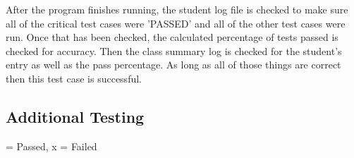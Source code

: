 After the program finishes running, the student log file is checked to make sure all of the critical test cases were 'PASSED' and all of the other test cases were run. Once that has been checked, the calculated percentage of tests passed is checked for accuracy. Then the class summary log is checked for the student's entry as well as the pass percentage. As long as all of those things are correct then this test case is successful.


\subsection{Additional Testing}


\begin{center}
\checkmark = Passed, x = Failed
\end{center}

